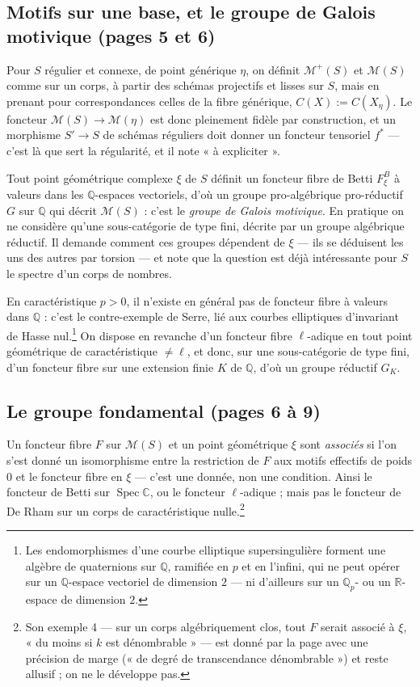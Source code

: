 \documentclass[11pt,a4paper]{article}
\begin{document}
\subsection*{Motifs sur une base, et le groupe de Galois motivique (pages 5 et 6)}

Pour $S$ régulier et connexe, de point générique $\eta$, on définit
$\mathcal{M}^{+}(S)$ et $\mathcal{M}(S)$ comme sur un corps, à partir des
schémas projectifs et lisses sur $S$, mais en prenant pour correspondances
celles de la fibre générique, $C(X) := C(X_{\eta})$. Le foncteur $\mathcal{M}(S)
\to \mathcal{M}(\eta)$ est donc pleinement fidèle par construction, et un
morphisme $S' \to S$ de schémas réguliers doit donner un foncteur tensoriel
$f^{*}$ --- c'est là que sert la régularité, et il note « à expliciter ».

Tout point géométrique complexe $\xi$ de $S$ définit un foncteur fibre de Betti
$F^{B}_{\xi}$ à valeurs dans les $\mathbb{Q}$-espaces vectoriels, d'où un groupe
pro-algébrique pro-réductif $G$ sur $\mathbb{Q}$ qui décrit $\mathcal{M}(S)$ :
c'est le \emph{groupe de Galois motivique}. En pratique on ne considère qu'une
sous-catégorie de type fini, décrite par un groupe algébrique réductif. Il
demande comment ces groupes dépendent de $\xi$ --- ils se déduisent les uns des
autres par torsion --- et note que la question est déjà intéressante pour $S$
le spectre d'un corps de nombres.

En caractéristique $p > 0$, il n'existe en général pas de foncteur fibre à
valeurs dans $\mathbb{Q}$ : c'est le contre-exemple de Serre, lié aux courbes
elliptiques d'invariant de Hasse nul.\footnote{Les endomorphismes d'une courbe
elliptique supersingulière forment une algèbre de quaternions sur $\mathbb{Q}$,
ramifiée en $p$ et en l'infini, qui ne peut opérer sur un $\mathbb{Q}$-espace
vectoriel de dimension $2$ --- ni d'ailleurs sur un $\mathbb{Q}_{p}$- ou un
$\mathbb{R}$-espace de dimension $2$.} On dispose en revanche d'un foncteur fibre
$\ell$-adique en tout point géométrique de caractéristique $\neq \ell$, et donc,
sur une sous-catégorie de type fini, d'un foncteur fibre sur une extension
finie $K$ de $\mathbb{Q}$, d'où un groupe réductif $G_{K}$.

\subsection*{Le groupe fondamental (pages 6 à 9)}

Un foncteur fibre $F$ sur $\mathcal{M}(S)$ et un point géométrique $\xi$ sont
\emph{associés} si l'on s'est donné un isomorphisme entre la restriction de $F$
aux motifs effectifs de poids $0$ et le foncteur fibre en $\xi$ --- c'est une
donnée, non une condition. Ainsi le foncteur de Betti sur $\operatorname{Spec}
\mathbb{C}$, ou le foncteur $\ell$-adique ; mais pas le foncteur de De Rham sur un
corps de caractéristique nulle.\footnote{Son exemple 4 --- sur un corps
algébriquement clos, tout $F$ serait associé à $\xi$, « du moins si $k$ est
dénombrable » --- est donné par la page avec une précision de marge (« de degré
de transcendance dénombrable ») et reste allusif ; on ne le développe pas.}
\end{document}
